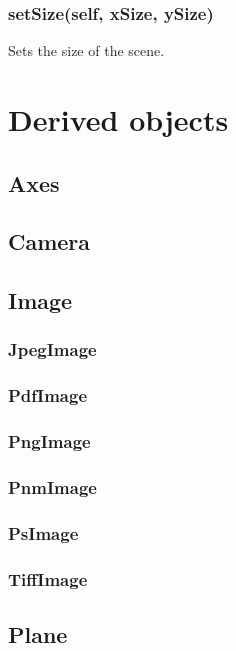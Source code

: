 \subsubsection{setSize(self, xSize, ySize)}

Sets the size of the scene.

\section{Derived objects}

\subsection{Axes}

\subsection{Camera}

\subsection{Image}

\subsubsection{JpegImage}

\subsubsection{PdfImage}

\subsubsection{PngImage}

\subsubsection{PnmImage}

\subsubsection{PsImage}

\subsubsection{TiffImage}

\subsection{Plane}


